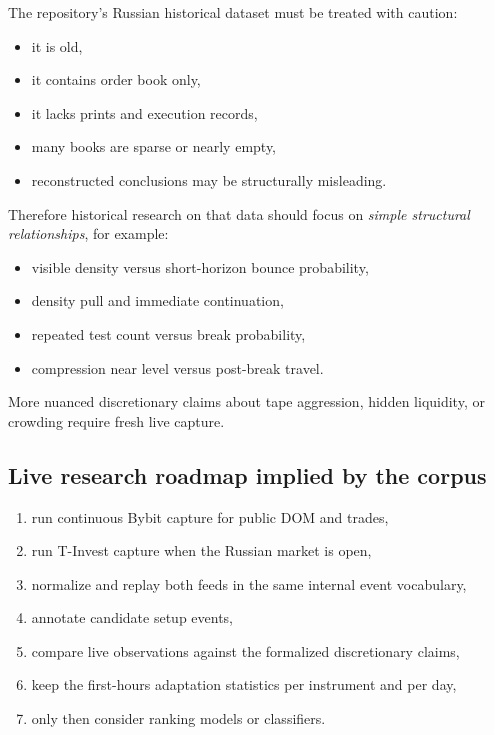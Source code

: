 The repository's Russian historical dataset must be treated with caution:

\begin{itemize}
\item it is old,
\item it contains order book only,
\item it lacks prints and execution records,
\item many books are sparse or nearly empty,
\item reconstructed conclusions may be structurally misleading.
\end{itemize}

Therefore historical research on that data should focus on \emph{simple structural relationships}, for example:

\begin{itemize}
\item visible density versus short-horizon bounce probability,
\item density pull and immediate continuation,
\item repeated test count versus break probability,
\item compression near level versus post-break travel.
\end{itemize}

More nuanced discretionary claims about tape aggression, hidden liquidity, or crowding require fresh live capture.

\subsection{Live research roadmap implied by the corpus}

\begin{enumerate}
\item run continuous Bybit capture for public DOM and trades,
\item run T-Invest capture when the Russian market is open,
\item normalize and replay both feeds in the same internal event vocabulary,
\item annotate candidate setup events,
\item compare live observations against the formalized discretionary claims,
\item keep the first-hours adaptation statistics per instrument and per day,
\item only then consider ranking models or classifiers.
\end{enumerate}

